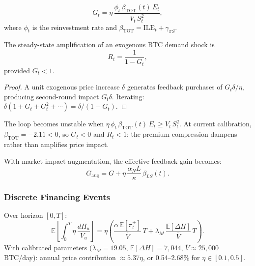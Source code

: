 \begin{definition}
  \begin{equation}
    G_t = \eta\,\frac{\phi_t\,\beta_{\mathrm{TOT}}(t)\,E_t}{V_t\,S_t^2},
  \end{equation}
  where $\phi_t$ is the reinvestment rate and
  $\beta_{\mathrm{TOT}} = \mathrm{ILE}_t + \gamma_{\pi S}$.
\end{definition}

\begin{proposition}\label{prop:reflexivity}
  The steady-state amplification of an exogenous BTC demand shock is
  \begin{equation}
    R_t = \frac{1}{1 - G_t},
  \end{equation}
  provided $G_t < 1$.
\end{proposition}

\begin{proof}
  A unit exogenous price increase $\delta$ generates feedback purchases of
  $G_t\delta/\eta$, producing second-round impact $G_t\delta$.  Iterating:
  $\delta(1 + G_t + G_t^2 + \cdots) = \delta/(1-G_t)$.
\end{proof}

\begin{proposition}\label{prop:instability}
  The loop becomes unstable when
  $\eta\,\phi_t\,\beta_{\mathrm{TOT}}(t)\,E_t \ge V_t\,S_t^2$.
  At current calibration, $\beta_{\mathrm{TOT}} = -2.11 < 0$, so $G_t < 0$
  and $R_t < 1$: the premium compression dampens rather than amplifies price
  impact.
\end{proposition}

With market-impact augmentation, the effective feedback gain becomes:
\begin{equation}
  G_{\mathrm{aug}} = G + \eta\,\frac{\alpha_N L}{\kappa}\,\beta_{LS}(t).
\end{equation}

\subsubsection{Discrete Financing Events}

\begin{theorem}
  \label{thm:expected_impact}
  Over horizon $[0,T]$:
  \begin{equation}
    \mathbb{E}\!\left[\int_0^T \eta\,\frac{dH_u}{V_u}\right]
    = \eta\left(
      \frac{\alpha\,\mathbb{E}[\pi_t^+]}{\bar{V}}\,T
      + \lambda_M\,\frac{\mathbb{E}[\Delta H]}{\bar{V}}\,T
    \right).
  \end{equation}
  With calibrated parameters ($\lambda_M = 19.05$,
  $\mathbb{E}[\Delta H] = 7{,}044$, $\bar{V} \approx 25{,}000$ BTC/day):
  annual price contribution $\approx 5.37\eta$, or 0.54--2.68\% for
  $\eta \in [0.1, 0.5]$.
\end{theorem}


